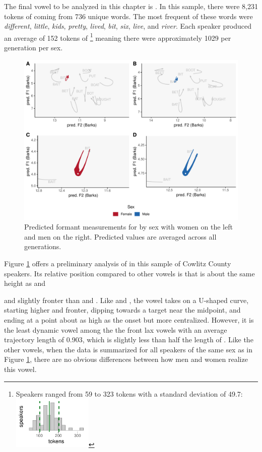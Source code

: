 The final vowel to be analyzed in this chapter is \bit. In this sample, there were 8,231 tokens of \bit coming from 736 unique words. The most frequent of these words were \textit{different}, \textit{little}, \textit{kids}, \textit{pretty}, \textit{lived}, \textit{bit}, \textit{six}, \textit{live}, and \textit{river}. Each speaker produced an average of 152 tokens of \bit\footnote{Speakers ranged from 59 to 323 tokens with a standard deviation of 49.7: \includegraphics[width = 1.5in]{Figures/BIT/BIT_tiny.pdf}} meaning there were approximately 1029 per generation per sex.

\begin{figure}[tb!]
	\centering
	\includegraphics[width = 6.5in]{Figures/BIT/BIT_four_panel_plot_summarized.pdf}
	\caption[Predicted formant measurements for \bit by sex.]{Predicted formant measurements for \bit by sex with women on the left and men on the right. Predicted values are averaged across all generations.}
	\label{fig:BIT_four_panel_summarized}
\end{figure}

Figure \ref{fig:BIT_four_panel_summarized} offers a preliminary analysis of \bit in this sample of Cowlitz County speakers. Its relative position compared to other vowels is that is about the same height as \face and \strut and slightly fronter than \bet and \bat. Like \bat and \bet, the \bit vowel takes on a U-shaped curve, starting higher and fronter, dipping towards a target near the midpoint, and ending at a point about as high as the onset but more centralized. However, it is the least dynamic vowel among the the front lax vowels with an average trajectory length of 0.903, which is slightly less than half the length of \bat. Like the other vowels, when the data is summarized for all speakers of the same sex as in Figure \ref{fig:BIT_four_panel_summarized}, there are no obvious differences between how men and women realize this vowel.

